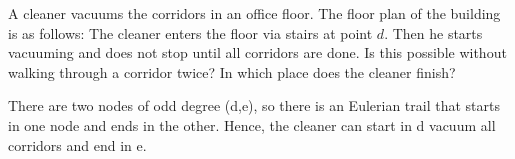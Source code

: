 A cleaner vacuums the corridors in an office floor. The floor plan of the building is as follows:
The cleaner enters the floor via stairs at point $d$. Then he starts vacuuming and does not stop until all corridors are done. Is this possible without walking through a corridor twice? In which place does the cleaner finish? 

\solution
There are two nodes of odd degree (d,e), so there is an Eulerian trail that starts in one node and ends in the other. Hence, the cleaner can start in d vacuum all corridors and end in e.  